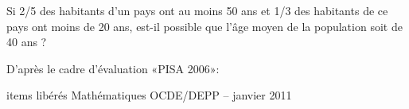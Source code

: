 
Si 2/5 des habitants d'un pays ont au moins 50 ans et 1/3 des habitants de ce pays ont moins de 20 ans, est-il possible que l'âge moyen de la population soit de 40 ans ?

\hfill{D’après le cadre d’évaluation «PISA 2006»:}
 
\hfill{items libérés Mathématiques OCDE/DEPP – janvier 2011}

